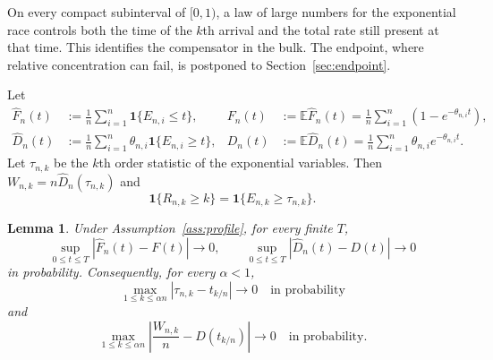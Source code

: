 \documentclass[11pt]{article}
\newtheorem{lemma}[theorem]{Lemma}
\theoremstyle{remark}
\theoremstyle{plain}
\newcommand{\E}{\mathbb E}
\newcommand{\one}{\mathbf 1}
\begin{document}
On every compact subinterval of $[0,1)$, a law of large numbers for the
exponential race controls both the time of the $k$th arrival and the total
rate still present at that time.  This identifies the compensator in the
bulk.  The endpoint, where relative concentration can fail, is postponed to
Section~\ref{sec:endpoint}.

Let
\begin{align}
 \widehat F_n(t)&:=\frac1n\sum_{i=1}^n\one\{E_{n,i}\le t\},
 &F_n(t)&:=\E\widehat F_n(t)
 =\frac1n\sum_{i=1}^n(1-e^{-\theta_{n,i}t}),\label{eq:empirical-F}\\
 \widehat D_n(t)&:=\frac1n\sum_{i=1}^n
 \theta_{n,i}\one\{E_{n,i}\ge t\},
 &D_n(t)&:=\E\widehat D_n(t)
 =\frac1n\sum_{i=1}^n\theta_{n,i}e^{-\theta_{n,i}t}.
 \label{eq:empirical-D}
\end{align}
Let $\tau_{n,k}$ be the $k$th order statistic of the exponential variables.
Then $W_{n,k}=n\widehat D_n(\tau_{n,k})$ and
\begin{equation}\label{eq:survival-indicator}
 \one\{R_{n,k}\ge k\}=\one\{E_{n,k}\ge\tau_{n,k}\}.
\end{equation}

\begin{lemma}\label{lem:race-law}
Under Assumption~\ref{ass:profile}, for every finite $T$,
\begin{equation}\label{eq:uniform-race}
 \sup_{0\le t\le T}|\widehat F_n(t)-F(t)|\longrightarrow0,
 \qquad
 \sup_{0\le t\le T}|\widehat D_n(t)-D(t)|\longrightarrow0
\end{equation}
in probability.  Consequently, for every $\alpha<1$,
\begin{equation}\label{eq:uniform-quantile}
 \max_{1\le k\le\alpha n}|\tau_{n,k}-t_{k/n}|\longrightarrow0
 \quad\text{in probability}
\end{equation}
and
\begin{equation}\label{eq:uniform-denominator}
 \max_{1\le k\le\alpha n}
 \left|\frac{W_{n,k}}n-D(t_{k/n})\right|\longrightarrow0
 \quad\text{in probability}.
\end{equation}
\end{lemma}
\end{document}

